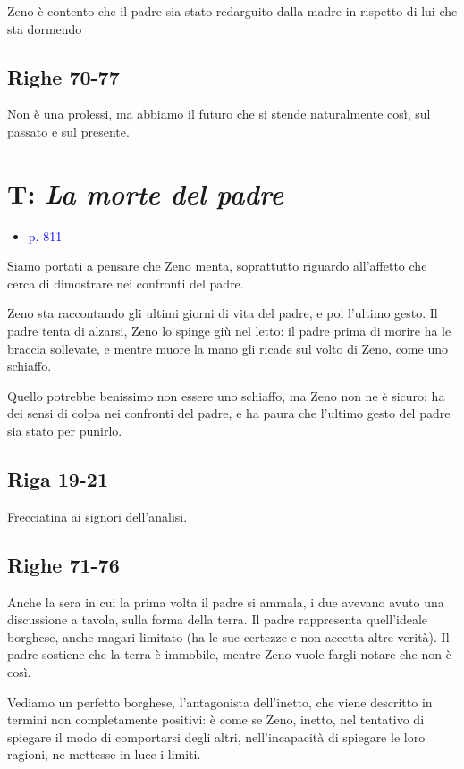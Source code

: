 \documentclass[a4paper, twoside, titlepage]{book}
\newcommand{\elenco}[1]{%
\begin{itemize}
#1
\end{itemize}}
\renewcommand{\emph}[1]{\textcolor{blue}{#1}}
\begin{document}
Zeno è contento che il padre sia stato redarguito dalla madre in rispetto di lui che sta dormendo

\subsection*{Righe 70-77}

Non è una prolessi, ma abbiamo il futuro che si stende naturalmente così, sul passato e sul presente.

\section{T: \textit{La morte del padre}}
\elenco{\item \emph{p. 811}}

Siamo portati a pensare che Zeno menta, soprattutto riguardo all'affetto che cerca di dimostrare nei confronti del padre.

Zeno sta raccontando gli ultimi giorni di vita del padre, e poi l'ultimo gesto. Il padre tenta di alzarsi, Zeno lo spinge giù nel letto: il padre prima di morire ha le braccia sollevate, e mentre muore la mano gli ricade sul volto di Zeno, come uno schiaffo.

Quello potrebbe benissimo non essere uno schiaffo, ma Zeno non ne è sicuro: ha dei sensi di colpa nei confronti del padre, e ha paura che l'ultimo gesto del padre sia stato per punirlo.

\subsection*{Riga 19-21}

Frecciatina ai signori dell'analisi.

\subsection*{Righe 71-76}

Anche la sera in cui la prima volta il padre si ammala, i due avevano avuto una discussione a tavola, sulla forma della terra. Il padre rappresenta quell'ideale borghese, anche magari limitato (ha le sue certezze e non accetta altre verità). Il padre sostiene che la terra è immobile, mentre Zeno vuole fargli notare che non è così.

Vediamo un perfetto borghese, l'antagonista dell'inetto, che viene descritto in termini non completamente positivi: è come se Zeno, inetto, nel tentativo di spiegare il modo di comportarsi degli altri, nell'incapacità di spiegare le loro ragioni, ne mettesse in luce i limiti.
\end{document}
